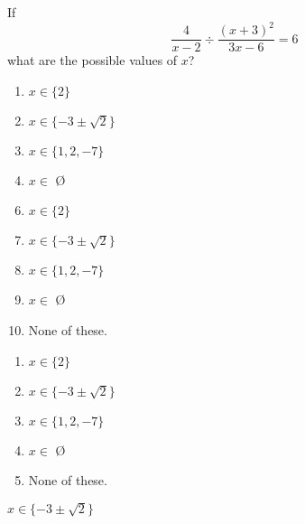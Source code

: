   
If $$\frac{4}{x-2}\div\frac{(x+3)^2}{3x-6}=6$$ what are the possible values of $x$?


\ifsat
	\begin{enumerate}[label=\Alph*)]
		\item $x \in \{2\}$
		\item $x \in \{-3 \pm \sqrt{2}\}$ %
		\item $x \in \{1,2,-7\}$
		\item $x \in$ \O
	\end{enumerate}
\else
\fi

\ifacteven
	\begin{enumerate}[label=\textbf{\Alph*.},itemsep=\fill,align=left]
		\setcounter{enumii}{5}
		\item $x \in \{2\}$
		\item $x \in \{-3 \pm \sqrt{2}\}$ %
		\item $x \in \{1,2,-7\}$
		\addtocounter{enumii}{1}
		\item $x \in$ \O
		\item None of these. 
	\end{enumerate}
\else
\fi

\ifactodd
	\begin{enumerate}[label=\textbf{\Alph*.},itemsep=\fill,align=left]
		\item $x \in \{2\}$
		\item $x \in \{-3 \pm \sqrt{2}\}$ %
		\item $x \in \{1,2,-7\}$
		\item $x \in$ \O
		\item None of these. 
	\end{enumerate}
\else
\fi

\ifgridin
 $x \in \{-3 \pm \sqrt{2}\}$ %
		
\else
\fi

